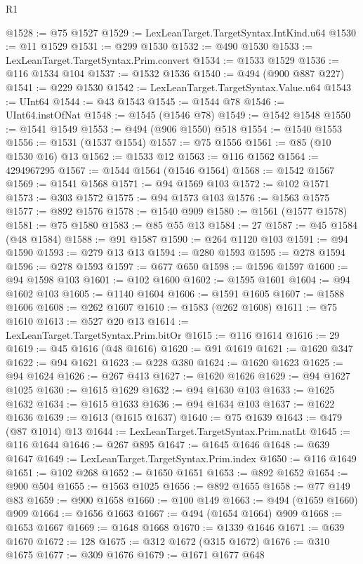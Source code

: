 \begin{lexlean}{R1}
\begin{coremodule}
@1528 := @75 @1527
@1529 := LexLeanTarget.TargetSyntax.IntKind.u64
@1530 := @11 @1529
@1531 := @299 @1530
@1532 := @490 @1530
@1533 := LexLeanTarget.TargetSyntax.Prim.convert
@1534 := @1533 @1529
@1536 := @116 @1534 @104
@1537 := @1532 @1536
@1540 := @494 (@900 @887 @227)
@1541 := @229 @1530
@1542 := LexLeanTarget.TargetSyntax.Value.u64
@1543 := UInt64
@1544 := @43 @1543
@1545 := @1544 @78
@1546 := UInt64.instOfNat
@1548 := @1545 (@1546 @78)
@1549 := @1542 @1548
@1550 := @1541 @1549
@1553 := @494 (@906 @1550) @518
@1554 := @1540 @1553
@1556 := @1531 (@1537 @1554)
@1557 := @75 @1556
@1561 := @85 (@10 @1530 @16) @13
@1562 := @1533 @12
@1563 := @116 @1562
@1564 := 4294967295
@1567 := @1544 @1564 (@1546 @1564)
@1568 := @1542 @1567
@1569 := @1541 @1568
@1571 := @94 @1569 @103
@1572 := @102 @1571
@1573 := @303 @1572
@1575 := @94 @1573 @103
@1576 := @1563 @1575
@1577 := @892 @1576
@1578 := @1540 @909
@1580 := @1561 (@1577 @1578)
@1581 := @75 @1580
@1583 := @85 @55 @13
@1584 := 27
@1587 := @45 @1584 (@48 @1584)
@1588 := @91 @1587
@1590 := @264 @1120 @103
@1591 := @94 @1590
@1593 := @279 @13 @13
@1594 := @280 @1593
@1595 := @278 @1594
@1596 := @278 @1593
@1597 := @677 @650
@1598 := @1596 @1597
@1600 := @94 @1598 @103
@1601 := @102 @1600
@1602 := @1595 @1601
@1604 := @94 @1602 @103
@1605 := @1140 @1604
@1606 := @1591 @1605
@1607 := @1588 @1606
@1608 := @262 @1607
@1610 := @1583 (@262 @1608)
@1611 := @75 @1610
@1613 := @527 @20 @13
@1614 := LexLeanTarget.TargetSyntax.Prim.bitOr
@1615 := @116 @1614
@1616 := 29
@1619 := @45 @1616 (@48 @1616)
@1620 := @91 @1619
@1621 := @1620 @347
@1622 := @94 @1621
@1623 := @228 @380
@1624 := @1620 @1623
@1625 := @94 @1624
@1626 := @267 @413
@1627 := @1620 @1626
@1629 := @94 @1627 @1025
@1630 := @1615 @1629
@1632 := @94 @1630 @103
@1633 := @1625 @1632
@1634 := @1615 @1633
@1636 := @94 @1634 @103
@1637 := @1622 @1636
@1639 := @1613 (@1615 @1637)
@1640 := @75 @1639
@1643 := @479 (@87 @1014) @13
@1644 := LexLeanTarget.TargetSyntax.Prim.natLt
@1645 := @116 @1644
@1646 := @267 @895
@1647 := @1645 @1646
@1648 := @639 @1647
@1649 := LexLeanTarget.TargetSyntax.Prim.index
@1650 := @116 @1649
@1651 := @102 @268
@1652 := @1650 @1651
@1653 := @892 @1652
@1654 := @900 @504
@1655 := @1563 @1025
@1656 := @892 @1655
@1658 := @77 @149 @83
@1659 := @900 @1658
@1660 := @100 @149
@1663 := @494 (@1659 @1660) @909
@1664 := @1656 @1663
@1667 := @494 (@1654 @1664) @909
@1668 := @1653 @1667
@1669 := @1648 @1668
@1670 := @1339 @1646
@1671 := @639 @1670
@1672 := 128
@1675 := @312 @1672 (@315 @1672)
@1676 := @310 @1675
@1677 := @309 @1676
@1679 := @1671 @1677 @648

\end{coremodule}
\end{lexlean}
